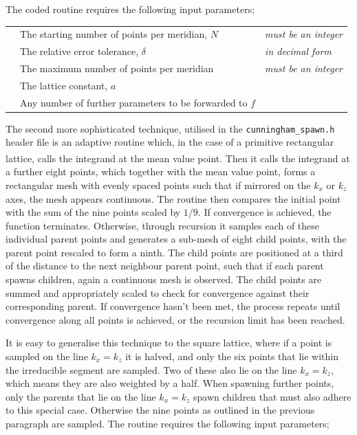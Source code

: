\documentclass[a4paper, 12pt]{article}
\newcommand{\site}[1]{\textsuperscript{\textcolor{blue}{\cite{#1}}}}
\begin{document}
The coded routine requires the following input parameters;
\\
\begin{listliketab}
	\begin{tabular}{lll}
	\textbullet &The starting number of points per meridian, $N$ &{\it must be an integer}\\
	\textbullet &The relative error tolerance, $\delta$ &{\it in decimal form}\\
	\textbullet &The maximum number of points per meridian &{\it must be an integer}\\
	\textbullet &The lattice constant, $a$ & \\
	\textbullet &Any number of further parameters to be forwarded to $f$&\\
	\end{tabular}
\end{listliketab}
\par
The second more sophisticated technique, utilised in the {\tt cunningham\_spawn.h} header file is an adaptive routine which, in the case of a primitive rectangular lattice, calls the integrand at the mean value point\site{CP}. Then it calls the integrand at a further eight points, which together with the mean value point, forms a rectangular mesh with evenly spaced points such that if mirrored on the $k_x$ or $k_z$ axes, the mesh appears continuous. The routine then compares the initial point with the sum of the nine points scaled by $1/9$. If convergence is achieved, the function terminates. Otherwise, through recursion it samples each of these individual parent points and generates a sub-mesh of eight child points, with the parent point rescaled to form a ninth. The child points are positioned at a third of the distance to the next neighbour parent point, such that if each parent spawns children, again a continuous mesh is observed. The child points are summed and appropriately scaled to check for convergence against their corresponding parent. If convergence hasn't been met, the process repeats until convergence along all points is achieved, or the recursion limit has been reached.
\\[2mm]\par It is easy to generalise this technique to the square lattice, where if a point is sampled on the line $k_x = k_z$ it is halved, and only the six points that lie within the irreducible segment are sampled. Two of these also lie on the line $k_x = k_z$, which means they are also weighted by a half. When spawning further points, only the parents that lie on the line $k_x = k_z$ spawn children that must also adhere to this special case. Otherwise the nine points as outlined in the previous paragraph are sampled.
The routine requires the following input parameters;
\end{document}
